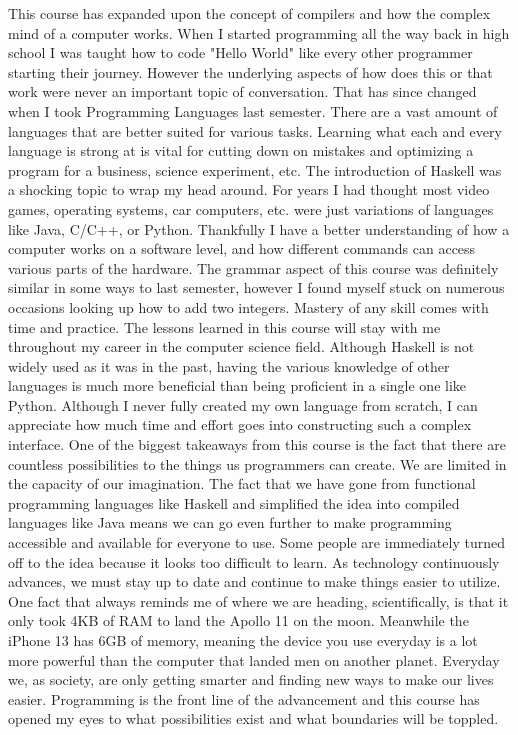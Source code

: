 \documentclass{article}
\theoremstyle{theorem}
\theoremstyle{definition}
\theoremstyle{remark}
\begin{document}
This course has expanded upon the concept of compilers and how the complex mind of a computer works. When I started programming all the way back in high school I was taught how to code "Hello World" like every other programmer starting their journey. However the underlying aspects of how does this or that work were never an important topic of conversation. That has since changed when I took Programming Languages last semester. There are a vast amount of languages that are better suited for various tasks. Learning what each and every language is strong at is vital for cutting down on mistakes and optimizing a program for a business, science experiment, etc. The introduction of Haskell was a shocking topic to wrap my head around. For years I had thought most video games, operating systems, car computers, etc. were just variations of languages like Java, C/C++, or Python. Thankfully I have a better understanding of how a computer works on a software level, and how different commands can access various parts of the hardware. The grammar aspect of this course was definitely similar in some ways to last semester, however I found myself stuck on numerous occasions looking up how to add two integers. Mastery of any skill comes with time and practice. The lessons learned in this course will stay with me throughout my career in the computer science field. Although Haskell is not widely used as it was in the past, having the various knowledge of other languages is much more beneficial than being proficient in a single one like Python. Although I never fully created my own language from scratch, I can appreciate how much time and effort goes into constructing such a complex interface. One of the biggest takeaways from this course is the fact that there are countless possibilities to the things us programmers can create. We are limited in the capacity of our imagination. The fact that we have gone from functional programming languages like Haskell and simplified the idea into compiled languages like Java means we can go even further to make programming accessible and available for everyone to use. Some people are immediately turned off to the idea because it looks too difficult to learn. As technology continuously advances, we must stay up to date and continue to make things easier to utilize. One fact that always reminds me of where we are heading, scientifically, is that it only took 4KB of RAM to land the Apollo 11 on the moon. Meanwhile the iPhone 13 has 6GB of memory, meaning the device you use everyday is a lot more powerful than the computer that landed men on another planet. Everyday we, as society, are only getting smarter and finding new ways to make our lives easier. Programming is the front line of the advancement and this course has opened my eyes to what possibilities exist and what boundaries will be toppled.
\end{document}
